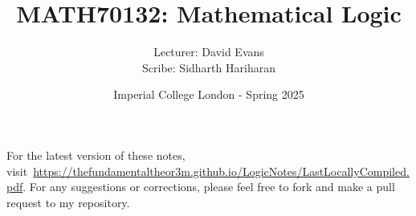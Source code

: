 \documentclass[a4paper, 12pt, openany, oneside]{book}
\title{\vspace{-2em}MATH70132: Mathematical Logic}
\author{Lecturer: David Evans \\ Scribe: Sidharth Hariharan}
\date{Imperial College London - Spring 2025}
\begin{document}
\setlength{\abovedisplayskip}{7.5pt}  %
\setlength{\belowdisplayskip}{7.5pt}  %
\setlength{\abovedisplayshortskip}{2pt}
\setlength{\belowdisplayshortskip}{2pt}

\maketitle
\thispagestyle{empty}

\tableofcontents
\thispagestyle{empty}

\newpage

\nocite{*}



% 
% 



\newpage




\printbibliography[prenote=mybibnote]
\thispagestyle{empty}

For the latest version of these notes, visit~\url{https://thefundamentaltheor3m.github.io/LogicNotes/LastLocallyCompiled.pdf}. For any suggestions or corrections, please feel free to fork and make a pull request to my repository.
\end{document}
